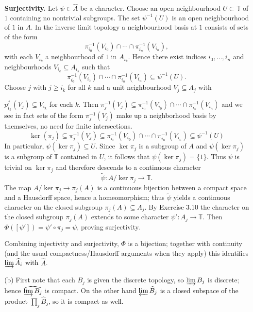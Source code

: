 \documentclass{article}
\begin{document}
\medskip

\noindent\textbf{Surjectivity.} Let $\psi\in\widehat A$ be a character. Choose an open neighbourhood $U\subset\mathbb T$ of $1$ containing no nontrivial subgroups. The set $\psi^{-1}(U)$ is an open neighbourhood of $1$ in $A$. In the inverse limit topology a neighbourhood basis at $1$ consists of sets of the form
\[
\pi_{i_0}^{-1}(V_{i_0})\cap\cdots\cap\pi_{i_n}^{-1}(V_{i_n}),
\]
with each $V_{i_k}$ a neighbourhood of $1$ in $A_{i_k}$. Hence there exist indices $i_0,\dots,i_n$ and neighbourhoods $V_{i_k}\subseteq A_{i_k}$ such that
\[
\pi_{i_0}^{-1}(V_{i_0})\cap\cdots\cap\pi_{i_n}^{-1}(V_{i_n})\subseteq\psi^{-1}(U).
\]
Choose $j$ with $j\ge i_k$ for all $k$ and a unit neighbourhood $V_j\subseteq A_j$ with 

\noindent $p_{i_k}^j(V_j)\subseteq V_{i_k}$ for each $k$. Then $\pi_j^{-1}(V_j) \subseteq \pi_{i_0}^{-1}(V_{i_0})\cap\cdots\cap\pi_{i_n}^{-1}(V_{i_n})$ and we see in fact sets of the form $\pi_j^{-1}(V_j)$ make up a neighborhood basis by themselves, no need for finite intersections.
\[
\ker(\pi_j) \subseteq \pi_j^{-1}(V_j)\subseteq\pi_{i_0}^{-1}(V_{i_0})\cap\cdots\cap\pi_{i_n}^{-1}(V_{i_n})\subseteq\psi^{-1}(U)
\]
In particular, $\psi(\ker\pi_j)\subseteq U$. Since $\ker\pi_j$ is a subgroup of $A$ and $\psi(\ker\pi_j)$ is a subgroup of $\mathbb T$ contained in $U$, it follows that $\psi(\ker\pi_j)=\{1\}$. Thus $\psi$ is trivial on $\ker\pi_j$ and therefore descends to a continuous character
\[
\widetilde\psi: A/\ker\pi_j \longrightarrow \mathbb T.
\]
The map $A/\ker\pi_j\to\pi_j(A)$ is a continuous bijection between a compact space and a Hausdorff space, hence a homeomorphism; thus $\widetilde\psi$ yields a continuous character on the closed subgroup $\pi_j(A)\subseteq A_j$. By Exercise 3.10 the character on the closed subgroup $\pi_j(A)$ extends to some character $\psi': A_j \rightarrow \mathbb T$. Then $\Phi([\psi'])=\psi'\circ\pi_j=\psi$, proving surjectivity.

\medskip

Combining injectivity and surjectivity, $\Phi$ is a bijection; together with continuity (and the usual compactness/Hausdorff arguments when they apply) this identifies $\varinjlim\widehat A_i$ with $\widehat A$.

\vspace{0.3cm}

\noindent (b) First note that each $B_j$ is given the discrete topology, so $\varinjlim B_j$ is discrete; hence $\widehat{\varinjlim B_j}$ is compact. On the other hand $\varprojlim \widehat B_j$ is a closed subspace of the product $\prod_{j}\widehat B_j$, so it is compact as well.
\end{document}
